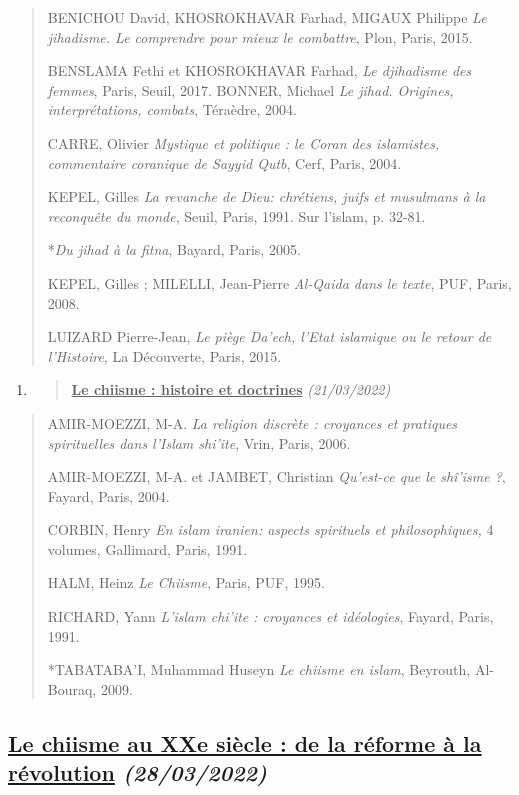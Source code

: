 \begin{quote}
BENICHOU David, KHOSROKHAVAR Farhad, MIGAUX Philippe \emph{Le jihadisme.
Le comprendre pour mieux le combattre}, Plon, Paris, 2015.

BENSLAMA Fethi et KHOSROKHAVAR Farhad, \emph{Le djihadisme des femmes},
Paris, Seuil, 2017. BONNER, Michael \emph{Le jihad. Origines,
interprétations, combats}, Téraèdre, 2004.

CARRE, Olivier \emph{Mystique et politique : le Coran des islamistes,
commentaire coranique de Sayyid Qutb}, Cerf, Paris, 2004.

KEPEL, Gilles \emph{La revanche de Dieu: chrétiens, juifs et musulmans à
la reconquête du monde}, Seuil, Paris, 1991. Sur l'islam, p. 32-81.

*\emph{Du jihad à la fitna}, Bayard, Paris, 2005.

KEPEL, Gilles ; MILELLI, Jean-Pierre \emph{Al-Qaida dans le texte}, PUF,
Paris, 2008.

LUIZARD Pierre-Jean, \emph{Le piège Da'ech, l'Etat islamique ou le
retour de l'Histoire}, La Découverte, Paris, 2015.
\end{quote}

\begin{enumerate}
\def\labelenumi{\arabic{enumi}.}
\setcounter{enumi}{1}
\item
  \begin{quote}
  \textbf{\underline{Le chiisme : histoire et doctrines}}
  \emph{(21/03/2022)}
  \end{quote}
\end{enumerate}

\begin{quote}
AMIR-MOEZZI, M-A. \emph{La religion discrète : croyances et pratiques
spirituelles dans l'Islam shi'ite}, Vrin, Paris, 2006.

AMIR-MOEZZI, M-A. et JAMBET, Christian \emph{Qu'est-ce que le shî'isme
?}, Fayard, Paris, 2004.

CORBIN, Henry \emph{En islam iranien: aspects spirituels et
philosophiques,} 4 volumes, Gallimard, Paris, 1991.

HALM, Heinz \emph{Le Chiisme}, Paris, PUF, 1995.

RICHARD, Yann \emph{L'islam chi'ite : croyances et idéologies}, Fayard,
Paris, 1991.

*TABATABA'I, Muhammad Huseyn \emph{Le chiisme en islam}, Beyrouth,
Al-Bouraq, 2009.
\end{quote}

\hypertarget{le-chiisme-au-xxe-siuxe8cle-de-la-ruxe9forme-uxe0-la-ruxe9volution-28032022}{%
\subsection{\texorpdfstring{\underline{Le chiisme au XXe siècle : de la
réforme à la révolution}
\emph{(28/03/2022)}}{Le chiisme au XXe siècle : de la réforme à la révolution (28/03/2022)}}\label{le-chiisme-au-xxe-siuxe8cle-de-la-ruxe9forme-uxe0-la-ruxe9volution-28032022}}

